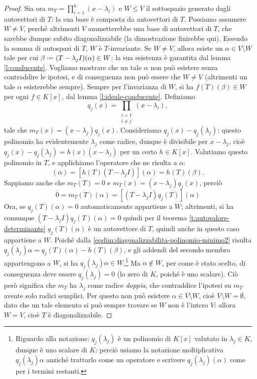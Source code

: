 \begin{proof}
	Sia ora $m_T=\prod_{i=1}^k(x-\lambda_i)$ e $W\le V$ il sottospazio generato dagli autovettori di $T$: la sua base è composta da autovettori di $T$.
	Possiamo assumere $W\ne V$, perch\'e altrimenti $V$ ammetterebbe una base di autovettori di $T$, che sarebbe dunque subito diagonalizzabile (la dimostrazione finirebbe qui).
	Essendo la somma di autospazi di $T$, $W$ è $T$-invariante.
	Se $W\ne V$, allora esiste un $\alpha\in V\setminus W$ tale per cui $\beta\defeq (T-\lambda_jI)(\alpha)\in W$: la sua esistenza è garantita dal lemma \ref{l:conducente}.
	Vogliamo mostrare che un tale $\alpha$ non può esistere senza contraddire le ipotesi, e di conseguenza non può essere che $W\ne V$ (altrimenti un tale $\alpha$ esisterebbe sempre).
	Sempre per l'invarianza di $W$, si ha $f(T)(\beta)\in W$ per ogni $f\in K[x]$, dal lemma \ref{l:ideale-conducente}.
	Definiamo
	\begin{equation*}
		q_j(x)=\prod_{\substack{i=1 \\ i\ne j}}(x-\lambda_i),
	\end{equation*}
	tale che $m_T(x)=(x-\lambda_j)q_j(x)$.
	Consideriamo $q_j(x)-q_j(\lambda_j)$: questo polinomio ha evidentemente $\lambda_j$ come radice, dunque è divisibile per $x-\lambda_j$, cioè $q_j(x)-q_j(\lambda_j)=h(x)(x-\lambda_j)$ per un certo $h\in K[x]$.
	Valutiamo questo polinomio in $T$, e applichiamo l'operatore che ne risulta a $\alpha$:
	\begin{equation}
		[q_j(T)-q_j(\lambda_j)](\alpha)=[h(T)(T-\lambda_jI)](\alpha)=h(T)(\beta).
		\label{eqdim:diagonalizzabilita-polinomio-minimo2}
	\end{equation}
	Sappiamo anche che $m_T(T)=0$ e $m_T(x)=(x-\lambda_j)q_j(x)$, perciò
	\begin{equation}
		0=m_T(T)(\alpha)=[(T-\lambda_jI)q_j(T)](\alpha)
	\end{equation}
	Ora, se $q_j(T)(\alpha)=0$ automaticamente appartiene a $W$; altrimenti, si ha comunque $(T-\lambda_jI)q_j(T)(\alpha)=0$ quindi per il teorema \ref{t:autovalore-determinante} $q_j(T)(\alpha)$ è un autovettore di $T$, quindi anche in questo caso appartiene a $W$.
	Poich\'e dalla \ref{eqdim:diagonalizzabilita-polinomio-minimo2} risulta $q_j(\lambda_j)\alpha=q_j(T)(\alpha)-h(T)(\beta)$, e gli addendi del secondo membro appartengono a $W$, si ha $q_j(\lambda_j)\alpha\in W$.\footnote{Riguardo alla notazione: $q_j(\lambda_j)$ è un polinomio di $K[x]$ valutato in $\lambda_j\in K$, dunque è uno scalare di $K$: perciò usiamo la notazione moltiplicativa $q_j(\lambda_j)\alpha$ anzich\'e trattarlo come un operatore e scrivere $q_j(\lambda_j)(\alpha)$ come per i termini restanti.}
	Ma $\alpha\notin W$, per come è stato scelto, di conseguenza deve essere $q_j(\lambda_j)=0$ (lo zero di $K$, poich\'e è uno scalare).
	Ciò però significa che $m_T$ ha $\lambda_j$ come radice \emph{doppia}, che contraddice l'ipotesi su $m_T$ avente solo radici semplici.
	Per questo non può esistere $\alpha\in V\setminus W$, cioè $V\setminus W=\emptyset$, dato che un tale elemento si può sempre trovare se $W$ non è l'intero $V$: allora $W=V$, cioè $T$ è diagonalizzabile.
\end{proof}

